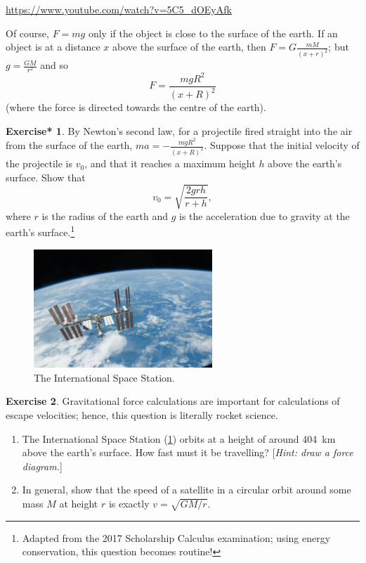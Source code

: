 \documentclass[a4paper]{amsbook}
\newcommand{\goandwatch}[1]{
\begin{center}
\begin{tcolorbox}[width=0.8\textwidth,colback={SkyBlue!20},title={\textbf{Go and watch...}},colbacktitle=MidnightBlue,coltitle=White]
  \textcolor{MidnightBlue}{\url{#1}}
\end{tcolorbox}
\end{center}}
\theoremstyle{definition}
\newtheorem{exercise}{Exercise}
\numberwithin{exercise}{chapter}
\newtheorem{exercise*}[exercise]{Exercise*}
\numberwithin{exercise}{chapter}
\begin{document}
\goandwatch{https://www.youtube.com/watch?v=5C5_dOEyAfk}

Of course, $ F = mg $ only if the object is close to the surface of the earth. If an object is at a distance $ x $ above the surface
of the earth, then $ F = G\frac{mM}{(x + r)^2} $; but $ g = \frac{GM}{r^2} $ and so
\begin{equation}
  F = \frac{mgR^2}{(x + R)^2}
\end{equation}
(where the force is directed towards the centre of the earth).

\begin{exercise*}
  By Newton's second law, for a projectile fired straight into the air from the surface of the earth, $ ma = -\frac{mgR^2}{(x + R)^2} $. Suppose
  that the initial velocity of the projectile is $ v_0 $, and that it reaches a maximum height $ h $ above the earth's surface. Show that
  \begin{displaymath}
    v_0 = \sqrt{\frac{2grh}{r + h}},
  \end{displaymath}
  where $ r $ is the radius of the earth and $ g $ is the acceleration due to gravity at the earth's surface.\footnote{Adapted from the 2017 Scholarship
  Calculus examination; using energy conservation, this question becomes routine!}
\end{exercise*}

\begin{figure}
  \centering
  \includegraphics[width=0.6\textwidth]{iss}
  \caption{The International Space Station.\label{fig:iss}}
\end{figure}
\begin{exercise}
  Gravitational force calculations are important for calculations of escape velocities; hence, this question is literally rocket science.
  \begin{enumerate}
    \item The International Space Station (\cref{fig:iss}) orbits at a height of around \SI{404}{\kilo\metre} above the earth's surface. How
          fast must it be travelling?  [\emph{Hint: draw a force diagram.}]
    \item In general, show that the speed of a satellite in a circular orbit around some mass $ M $ at height $ r $ is exactly $ v = \sqrt{GM/r} $.
  \end{enumerate}
\end{exercise}
\end{document}
